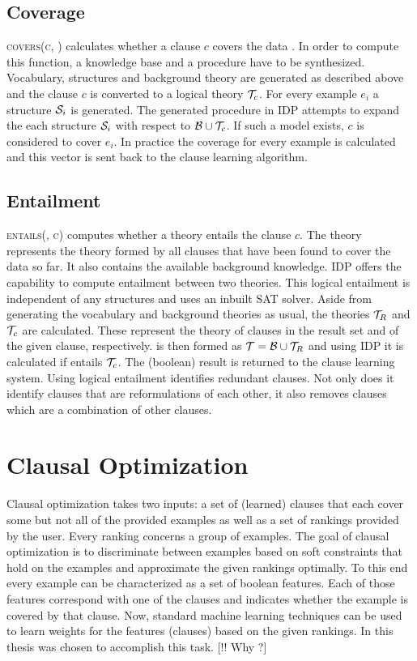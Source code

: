 \subsection{Coverage}
\textsc{covers(c, )} calculates whether a clause $c$ covers the data .
In order to compute this function, a knowledge base and a procedure have to be synthesized.
Vocabulary, structures and background theory are generated as described above and the clause $c$ is converted to a logical theory $\mathcal{T}_c$.
For every example $e_i$ a structure $\mathcal{S}_i$ is generated.
The generated procedure in IDP attempts to expand the each structure $\mathcal{S}_i$ with respect to $\mathcal{B} \cup \mathcal{T}_c$.
If such a model exists, $c$ is considered to cover $e_i$.
In practice the coverage for every example is calculated and this vector is sent back to the clause learning algorithm.

\subsection{Entailment}
\textsc{entails(, c)} computes whether a theory  entails the clause $c$.
The theory  represents the theory formed by all clauses that have been found to cover the data so far.
It also contains the available background knowledge.
IDP offers the capability to compute entailment between two theories.
This logical entailment is independent of any structures and uses an inbuilt SAT solver.
Aside from generating the vocabulary and background theories as usual, the theories $\mathcal{T}_R$ and $\mathcal{T}_c$ are calculated.
These represent the theory of clauses in the result set and of the given clause, respectively.
 is then formed as $\mathcal{T} = \mathcal{B} \cup \mathcal{T}_R$ and using IDP it is calculated if  entails $\mathcal{T}_c$.
The (boolean) result is returned to the clause learning system.
Using logical entailment identifies redundant clauses.
Not only does it identify clauses that are reformulations of each other, it also removes clauses which are a combination of other clauses.

\section{Clausal Optimization}
Clausal optimization takes two inputs: a set of (learned) clauses that each cover some but not all of the provided examples as well as a set of rankings provided by the user.
Every ranking concerns a group of examples.
The goal of clausal optimization is to discriminate between examples based on soft constraints that hold on the examples and approximate the given rankings optimally.
To this end every example can be characterized as a set of boolean features.
Each of those features correspond with one of the clauses and indicates whether the example is covered by that clause.
Now, standard machine learning techniques can be used to learn weights for the features (clauses) based on the given rankings.
In this thesis \svm{} was chosen to accomplish this task.
[!! Why \svm{}?]

